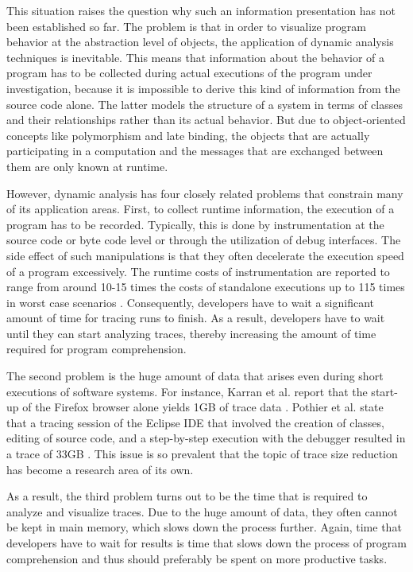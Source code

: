 This situation raises the question why such an information presentation has not been established so far.
The problem is that in order to visualize program behavior at the abstraction level of objects, the application of dynamic analysis techniques is inevitable.
This means that information about the behavior of a program has to be collected during actual executions of the program under investigation, because it is impossible to derive this kind of information from the source code alone.
The latter models the structure of a system in terms of classes and their relationships rather than its actual behavior.
But due to object-oriented concepts like polymorphism and late binding, the objects that are actually participating in a computation and the messages that are exchanged between them are only known at runtime.

However, dynamic analysis has four closely related problems that constrain many of its application areas.
First, to collect runtime information, the execution of a program has to be recorded.
Typically, this is done by instrumentation at the source code or byte code level or through the utilization of debug interfaces.
The side effect of such manipulations is that they often decelerate the execution speed of a program excessively.
The runtime costs of instrumentation are reported to range from around 10-15 times the costs of standalone executions up to 115 times in worst case scenarios \cite{pothier_scalable_2007, karran_synctrace:_2013}.
Consequently, developers have to wait a significant amount of time for tracing runs to finish.
As a result, developers have to wait until they can start analyzing traces, thereby increasing the amount of time required for program comprehension.

The second problem is the huge amount of data that arises even during short executions of software systems.
For instance, Karran et al. report that the start-up of the Firefox browser alone yields 1GB of trace data \cite{karran_extraction_2013}.
Pothier et al. state that a tracing session of the Eclipse IDE that involved the creation of classes, editing of source code, and a step-by-step execution with the debugger resulted in a trace of 33GB \cite{pothier_scalable_2007}.
This issue is so prevalent that the topic of trace size reduction has become a research area of its own.

As a result, the third problem turns out to be the time that is required to analyze and visualize traces.
Due to the huge amount of data, they often cannot be kept in main memory, which slows down the process further.
Again, time that developers have to wait for results is time that slows down the process of program comprehension and thus should preferably be spent on more productive tasks.

